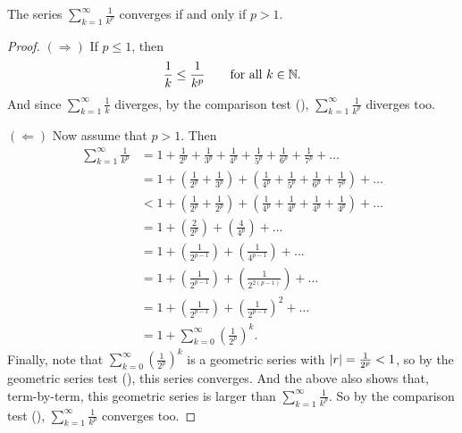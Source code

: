 \begin{proposition}
  The series $\sum_{k = 1}^{\infty} \frac{1}{k^p}$ converges if and
  only if $p > 1$.
\end{proposition}

\begin{proof}
  \phantom{.}

  $(\Rightarrow)$ If $p \leq 1$, then
  \[ \frac{1}{k} \leq \frac{1}{k^p} \qquad \text{for all $k \in \mathbb N$}. \]
  And since $\sum_{k = 1}^{\infty} \frac{1}{k}$ diverges, by the
  comparison test (), $\sum_{k = 1}^{\infty}
  \frac{1}{k^p}$ diverges too.

  $(\Leftarrow)$ Now assume that $p > 1$. Then
  \begin{align*}
    \sum_{k = 1}^{\infty} \frac{1}{k^p} & = 1 + \frac{1}{2^p} +
    \frac{1}{3^p} + \frac{1}{4^p} + \frac{1}{5^p} + \frac{1}{6^p} +
    \frac{1}{7^p} + \dots \\
    & = 1 + \left(\frac{1}{2^p} + \frac{1}{3^p}\right) +
    \left(\frac{1}{4^p} + \frac{1}{5^p} + \frac{1}{6^p} +
    \frac{1}{7^p}\right) + \dots \\
    & < 1 + \left(\frac{1}{2^p} + \frac{1}{2^p}\right) +
    \left(\frac{1}{4^p} + \frac{1}{4^p} + \frac{1}{4^p} +
    \frac{1}{4^p}\right) + \dots \\
    & = 1 + \left(\frac{2}{2^p}\right) + \left(\frac{4}{4^p}\right) + \dots \\
    & = 1 + \left(\frac{1}{2^{p - 1}}\right) + \left(\frac{1}{4^{p -
    1}}\right) + \dots \\
    & = 1 + \left(\frac{1}{2^{p - 1}}\right) + \left(\frac{1}{2^{2(p
    - 1)}}\right) + \dots \\
    & = 1 + \left(\frac{1}{2^{p - 1}}\right) + \left(\frac{1}{2^{p -
    1}}\right)^2 + \dots \\
    & = 1 + \sum_{k = 0}^{\infty} \left(\frac{1}{2^p}\right)^k.
  \end{align*}
  Finally, note that $\sum_{k = 0}^{\infty} (\frac{1}{2^p})^k$ is a
  geometric series with $| r | = \frac{1}{2^p} < 1$, so by the
  geometric series test (), this series
  converges. And the above also shows that, term-by-term, this
  geometric series is larger than $\sum_{k = 1}^{\infty}
  \frac{1}{k^p}$. So by the comparison test
  (), $\sum_{k = 1}^{\infty}
  \frac{1}{k^p}$ converges too.
\end{proof}

